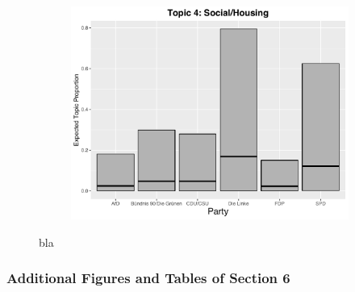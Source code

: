 \begin{figure}[h!]
\begin{subfigure}[b]{0.3\linewidth}
    \includegraphics[width=\linewidth]{../plots/appendix/4_4/direct_t4_cat.pdf}
  \end{subfigure}
  \caption{bla}
  \label{fig:coffee}
\end{figure}


\subsubsection*{Additional Figures and Tables of Section 6}

